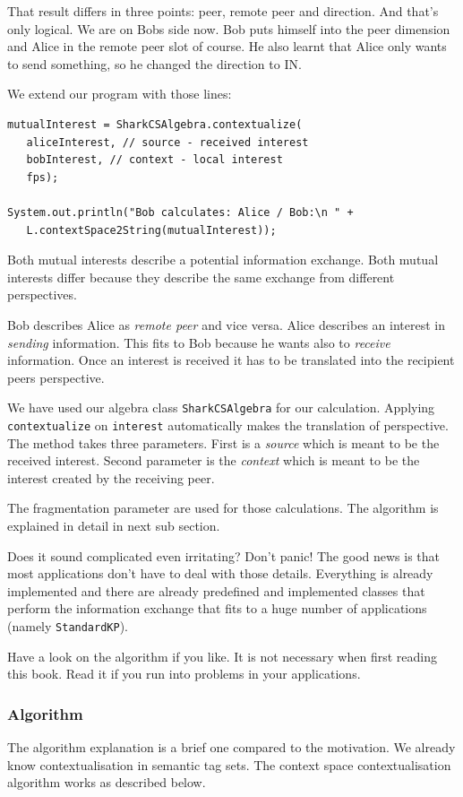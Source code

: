 That result differs in three points: peer, remote peer and direction. And that's only logical. We are on Bobs side now. Bob puts himself into the peer dimension and Alice in the remote peer slot of course. He also learnt that Alice only wants to send something, so he changed the direction to IN.

We extend our program with those lines:
\begin{verbatim}
mutualInterest = SharkCSAlgebra.contextualize(
   aliceInterest, // source - received interest
   bobInterest, // context - local interest
   fps);

System.out.println("Bob calculates: Alice / Bob:\n " +
   L.contextSpace2String(mutualInterest));
\end{verbatim}

Both mutual interests describe a potential information exchange. Both mutual interests differ because they describe the same exchange from different perspectives.

Bob describes Alice as {\it remote peer} and vice versa. Alice describes an interest in {\it sending} information. This fits to Bob because he wants also to {\it receive} information. Once an interest is received it has to be translated into the recipient peers perspective.

We have used our algebra class {\tt SharkCSAlgebra} for our calculation. Applying {\tt contextualize} on {\tt interest} automatically makes the translation of perspective. The method takes three parameters. First is a {\it source} which is meant to be the received interest. Second parameter is the {\it context} which is meant to be the interest created by the receiving peer.

The fragmentation parameter are used for those calculations. The algorithm is explained in detail in next sub section.

Does it sound complicated even irritating? Don't panic! The good news is that most applications don't have to deal with those details. Everything is already implemented and there are already predefined and implemented classes that perform the information exchange that fits to a huge number of applications (namely {\tt StandardKP}).

Have a look on the algorithm if you like. It is not necessary when first reading this book. Read it if you run into problems in your applications.

\subsubsection{Algorithm}
The algorithm explanation is a brief one compared to the motivation. We already know contextualisation in semantic tag sets. The context space contextualisation algorithm works as described below.

